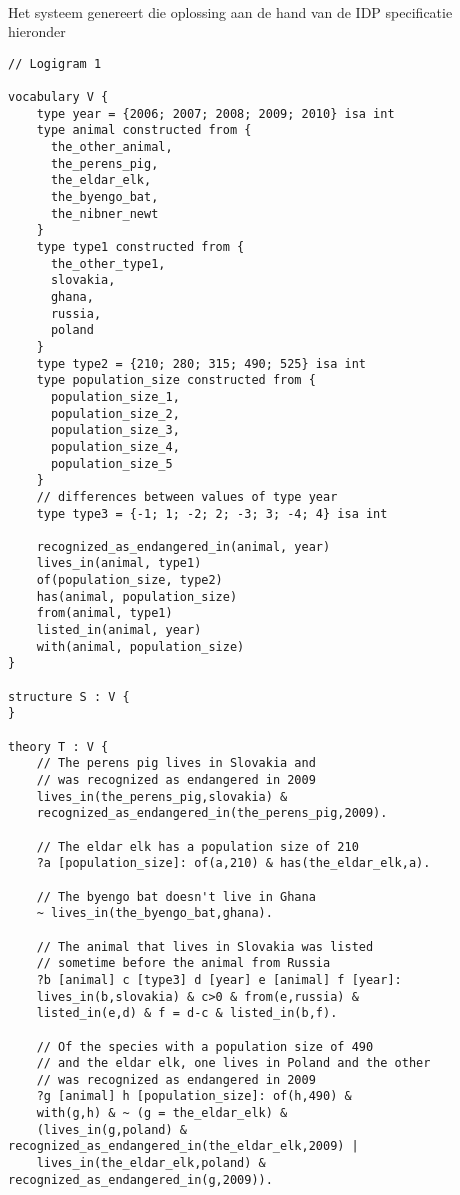 \paragraph{} Het systeem genereert die oplossing aan de hand van de IDP \cite{IDP} specificatie hieronder
\begin{lstlisting}
// Logigram 1

vocabulary V {
    type year = {2006; 2007; 2008; 2009; 2010} isa int
    type animal constructed from {
      the_other_animal,
      the_perens_pig,
      the_eldar_elk,
      the_byengo_bat,
      the_nibner_newt
    }
    type type1 constructed from {
      the_other_type1,
      slovakia,
      ghana,
      russia,
      poland
    }
    type type2 = {210; 280; 315; 490; 525} isa int
    type population_size constructed from {
      population_size_1,
      population_size_2,
      population_size_3,
      population_size_4,
      population_size_5
    }
    // differences between values of type year
    type type3 = {-1; 1; -2; 2; -3; 3; -4; 4} isa int 

    recognized_as_endangered_in(animal, year)
    lives_in(animal, type1)
    of(population_size, type2)
    has(animal, population_size)
    from(animal, type1)
    listed_in(animal, year)
    with(animal, population_size)
}

structure S : V {
}

theory T : V {
    // The perens pig lives in Slovakia and
    // was recognized as endangered in 2009
    lives_in(the_perens_pig,slovakia) &
    recognized_as_endangered_in(the_perens_pig,2009).

    // The eldar elk has a population size of 210
    ?a [population_size]: of(a,210) & has(the_eldar_elk,a).

    // The byengo bat doesn't live in Ghana
    ~ lives_in(the_byengo_bat,ghana).

    // The animal that lives in Slovakia was listed
    // sometime before the animal from Russia
    ?b [animal] c [type3] d [year] e [animal] f [year]:
    lives_in(b,slovakia) & c>0 & from(e,russia) &
    listed_in(e,d) & f = d-c & listed_in(b,f).

    // Of the species with a population size of 490
    // and the eldar elk, one lives in Poland and the other
    // was recognized as endangered in 2009
    ?g [animal] h [population_size]: of(h,490) &
    with(g,h) & ~ (g = the_eldar_elk) &
    (lives_in(g,poland) & recognized_as_endangered_in(the_eldar_elk,2009) |
    lives_in(the_eldar_elk,poland) & recognized_as_endangered_in(g,2009)).


\end{lstlisting}
